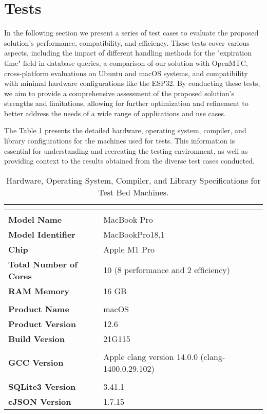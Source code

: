 \documentclass[a4paper,fleqn]{cas-dc}
\begin{document}
\section{Tests}

In the following section we present a series of test cases to evaluate the proposed solution's performance, compatibility, and efficiency. These tests cover various aspects, including the impact of different handling methods for the "expiration time" field in database queries, a comparison of our solution with OpenMTC, cross-platform evaluations on Ubuntu and macOS systems, and compatibility with minimal hardware configurations like the ESP32. By conducting these tests, we aim to provide a comprehensive assessment of the proposed solution's strengths and limitations, allowing for further optimization and refinement to better address the needs of a wide range of applications and use cases.

The Table \ref{tab:machinesSpecs} presents the detailed hardware, operating system, compiler, and library configurations for the machines used for tests. This information is essential for understanding and recreating the testing environment, as well as providing context to the results obtained from the diverse test cases conducted.

\begin{table}[h]
	\scriptsize
	\caption{Hardware, Operating System, Compiler, and Library Specifications for Test Bed Machines.}
	\label{tab:machinesSpecs}
	\begin{tabular}{>{\bfseries}p{3cm} p{4cm}}
	\toprule
	\multicolumn{2}{c}{\textbf{Machine1}} \\
	\toprule
	\toprule
	\multicolumn{2}{c}{\textbf{Hardware}} \\
	\midrule
	Model Name          & MacBook Pro \\
	Model Identifier    & MacBookPro18,1 \\
	Chip                & Apple M1 Pro \\
	Total Number of Cores & 10 (8 performance and 2 efficiency) \\
	RAM Memory          & 16 GB \\
	\midrule
	\multicolumn{2}{c}{\textbf{Operating System}} \\
	\midrule
	Product Name         & macOS \\
	Product Version      & 12.6 \\
	Build Version        & 21G115 \\
	\midrule
	\multicolumn{2}{c}{\textbf{Compiler}} \\
	\midrule
	GCC Version         & Apple clang version 14.0.0 (clang-1400.0.29.102) \\
	\midrule
	\multicolumn{2}{c}{\textbf{Libraries}} \\
	\midrule
	SQLite3 Version     & 3.41.1 \\
	cJSON Version       & 1.7.15 \\
	\bottomrule
	\bottomrule
	\end{tabular}
\end{table}
\end{document}

